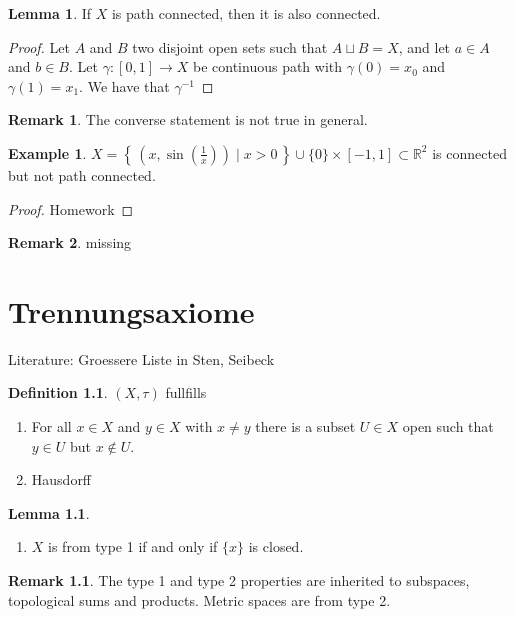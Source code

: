 \documentclass[a4paper]{book}
\theoremstyle{definition}
\newtheorem{definition}{Definition}[chapter]
\newtheorem{example}{Example}[definition]
\newtheorem{lemma}{Lemma}[definition]
\newtheorem*{remark}{Remark}
\newcommand{\makeset}[2]{\left\{\, #1 \mid #2 \,\right\}}
\begin{document}
    \begin{lemma}
        If \(X\) is path connected, then it is also connected.
    \end{lemma}
    \begin{proof}
        Let \(A\) and \(B\) two disjoint open sets such that \(A \sqcup B = X\), and let \(a \in A\) and \(b \in B\). Let \(\gamma: [0, 1] \longrightarrow X\) be continuous path with \(\gamma(0) = x_0\) and \(\gamma(1) = x_1\). We have that \(\gamma^{-1}\)
    \end{proof}

    \begin{remark}
        The converse statement is not true in general.
    \end{remark}

    \begin{example}
        \(X = \makeset{(x, \sin(\frac{1}{x}))}{x > 0} \cup \{0\} \times [-1, 1] \subset \mathbb{R}^2\) is connected but not path connected.
    \end{example}
    \begin{proof}
        Homework
    \end{proof}
    \begin{remark}
        missing
    \end{remark}

    \chapter{Trennungsaxiome}
    Literature: Groessere Liste in Sten, Seibeck

    \begin{defbox}
        \begin{definition}
            \((X, \tau)\) fullfills
            \begin{enumerate}
                \item For all \(x \in X\) and \(y \in X\) with \(x \neq y\) there is a subset \(U \in X\) open such that \(y \in U\) but \(x \not\in U\).
                \item Hausdorff
            \end{enumerate}
        \end{definition}
    \end{defbox}
    \begin{lemma}
        \begin{enumerate}
            \item \(X\) is from type 1 if and only if \(\{x\}\) is closed.
        \end{enumerate}
    \end{lemma}
    \begin{remark}
        The type 1 and type 2 properties are inherited to subspaces, topological sums and products.
        Metric spaces are from type 2.
    \end{remark}
\end{document}
